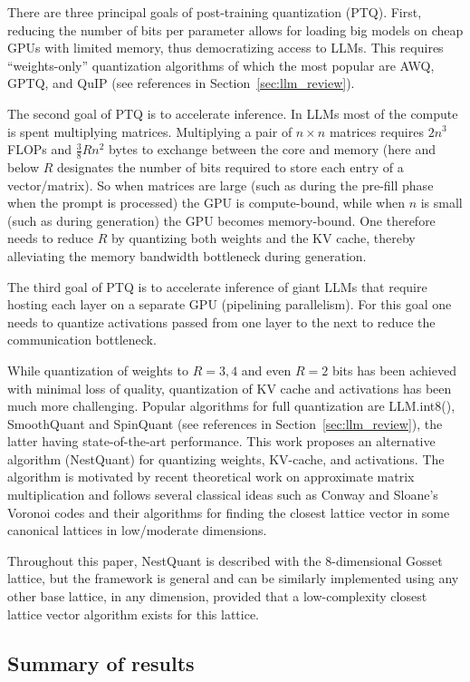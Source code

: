 \documentclass{article}
\theoremstyle{plain}
\theoremstyle{definition}
\theoremstyle{remark}
\begin{document}
There are three principal goals of post-training quantization (PTQ). First, reducing the number of bits per parameter allows for loading big models on cheap GPUs with limited memory, thus democratizing access to LLMs. This requires ``weights-only'' quantization algorithms of which the most popular are AWQ, GPTQ, and QuIP (see references in Section~\ref{sec:llm_review}). 

The second goal of PTQ is to accelerate inference. In LLMs most of the compute is spent multiplying matrices. Multiplying a pair of $n\times n$ matrices requires $2n^3$ FLOPs and ${\frac{3}{8}}Rn^2$ bytes to exchange between the core and memory (here and below $R$ designates the number of bits required to store each entry of a vector/matrix). So when matrices are large (such as during the pre-fill phase when the prompt is processed) the GPU is compute-bound, while when $n$ is small (such as during generation) the GPU becomes memory-bound. One therefore needs to reduce $R$ by quantizing both weights and the KV cache, thereby alleviating the memory bandwidth bottleneck during generation.

The third goal of PTQ is to accelerate inference of giant LLMs that require hosting each layer on
a separate GPU (pipelining parallelism). For this goal one needs to quantize activations passed
from one layer to the next to reduce the communication bottleneck.

While quantization of weights to $R=3,4$ and even $R=2$ bits has been achieved with minimal loss of quality, quantization of KV cache and activations has been much more challenging. 
Popular algorithms for full quantization are LLM.int8(), SmoothQuant and SpinQuant (see references in Section~\ref{sec:llm_review}),  the latter having state-of-the-art performance. This work proposes an alternative algorithm (NestQuant) for quantizing weights, KV-cache, and activations. The algorithm is motivated by recent theoretical work on approximate matrix multiplication and follows several classical ideas such as Conway and Sloane's Voronoi codes and their algorithms for finding the closest lattice vector in some canonical lattices in low/moderate dimensions. 

Throughout this paper, NestQuant is described with the $8$-dimensional Gosset lattice, but the framework is general and can be similarly implemented using any other base lattice, in any dimension, provided that a low-complexity closest lattice vector algorithm exists for this lattice. 

\subsection{Summary of results}
\end{document}
